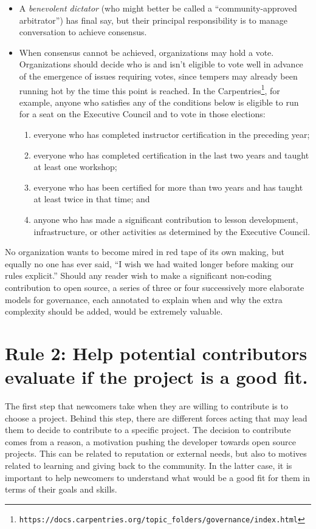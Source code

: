\documentclass[10pt,letterpaper]{article}
\newcommand{\rulemajor}[1]{\section{#1}}
\newcommand{\withurl}[2]{{#1}\footnote{{\texttt{#2}}}}
\begin{document}
\begin{itemize}

\item
  A \emph{benevolent dictator} (who might better be called a ``community-approved arbitrator'') has final say,
  but their principal responsibility is to manage conversation to achieve consensus.

\item
  When consensus cannot be achieved,
  organizations may hold a vote.
  Organizations should decide who is and isn't eligible to vote well in advance of the emergence of issues requiring votes,
  since tempers may already been running hot by the time this point is reached.
  In \withurl{the Carpentries}{https://docs.carpentries.org/topic\_folders/governance/index.html},
  for example,
  anyone who satisfies any of the conditions below is eligible to run for a seat on the Executive Council and to vote in those elections:
  \begin{enumerate}
    \item everyone who has completed instructor certification in the preceding year;
    \item everyone who has completed certification in the last two years and taught at least one workshop;
    \item everyone who has been certified for more than two years and has taught at least twice in that time; and
    \item anyone who has made a significant contribution to lesson development, infrastructure, or other activities as determined by the Executive Council.
  \end{enumerate}

\end{itemize}

No organization wants to become mired in red tape of its own making,
but equally no one has ever said,
``I wish we had waited longer before making our rules explicit.''
Should any reader wish to make a significant non-coding contribution to open source,
a series of three or four successively more elaborate models for governance,
each annotated to explain when and why the extra complexity should be added, would be extremely valuable.

\rulemajor{Rule 2: Help potential contributors evaluate if the project is a good fit.}

The first step that newcomers take when they are willing to contribute is to choose a project.
Behind this step,
there are different forces acting that may lead them to decide to contribute to a specific project.
The decision to contribute comes from a reason,
a motivation pushing the developer towards open source projects.
This can be related to reputation or external needs,
but also to motives related to learning and giving back to the community.
In the latter case,
it is important to help newcomers to understand what would be a good fit for them in terms of their goals and skills.
\end{document}
